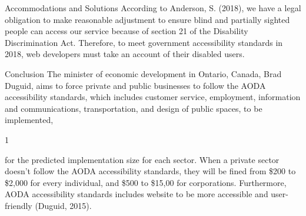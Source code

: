 \documentclass[11pt, titlepage]{article}
\newenvironment{cite_figure}[1]
{
	See \textbf{Figure #1}
}{}
\newenvironment{doc_heading}[1]
{
     \section*{\sffamily \LARGE \capitalisewords{#1}}
}{}
\begin{document}
\begin{doc_heading}{Accommodations and Solutions}
According to Anderson, S. (2018), we have a legal obligation to make reasonable adjustment to ensure blind and partially sighted people can access our service because of section 21 of the Disability Discrimination Act. Therefore, to meet government accessibility standards in 2018, web developers must take an account of their disabled users.
\end{doc_heading}



\iffalse
https://www.ontario.ca/page/path-2025-ontarios-accessibility-action-plan
\fi
\begin{doc_heading}{Conclusion}
The minister of economic development in Ontario, Canada, Brad Duguid, aims to force private and public businesses to follow the AODA accessibility standards, which includes customer service, employment, information and communications, transportation, and design of public spaces, to be implemented, \begin{cite_figure}{1} \end{cite_figure} for the predicted implementation size for each sector. When a private sector doesn't follow the AODA accessibility standards, they will be fined from \$200 to \$2,000 for every individual, and \$500 to \$15,00 for corporations. Furthermore, AODA accessibility standards includes website to be more accessible and user-friendly (Duguid, 2015).\\
\end{doc_heading}



\newpage


\nocite{*}
\end{document}
